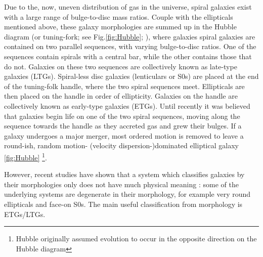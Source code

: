 	Due to the, now, uneven distribution of gas in the universe, spiral galaxies exist with a large range of bulge-to-disc mass ratios. Couple with the ellipticals mentioned above, these galaxy morphologies are summed up in the Hubble diagram (or tuning-fork; see Fig.\ref{fig:Hubble}; \citealt{Hubble1982, deVaucouleurs1959}), where galaxies spiral galaxies are contained on two parallel sequences, with varying bulge-to-disc ratios. One of the sequences contain spirals with a central bar, while the other contains those that do not. Galaxies on these two sequences are collectively known as late-type galaxies (LTGs). Spiral-less disc galaxies (lenticulars or S0s) are placed at the end of the tuning-folk handle, where the two spiral sequences meet. Ellipticals are then placed on the handle in order of ellipticity. Galaxies on the handle are collectively known as early-type galaxies (ETGs). Until recently it was believed that galaxies begin life on one of the two spiral sequences, moving along the sequence towards the handle as they accreted gas and grew their bulges. If a galaxy undergoes a major merger, most ordered motion is removed to leave a round-ish, random motion- (velocity dispersion-)dominated elliptical galaxy \ref{fig:Hubble} \footnote{Hubble originally assumed evolution to occur in the opposite direction on the Hubble diagram}. 

	However, recent studies have shown that a system which classifies galaxies by their morphologies only does not have much physical meaning \citep[e.g.][]{Cappellari2011, Sanchez2011, Arnold2013, Bryant2014}: some of the underlying systems are degenerate in their morphology, for example very round ellipticals and face-on S0s. The main useful classification from morphology is ETGs/LTGs. 


